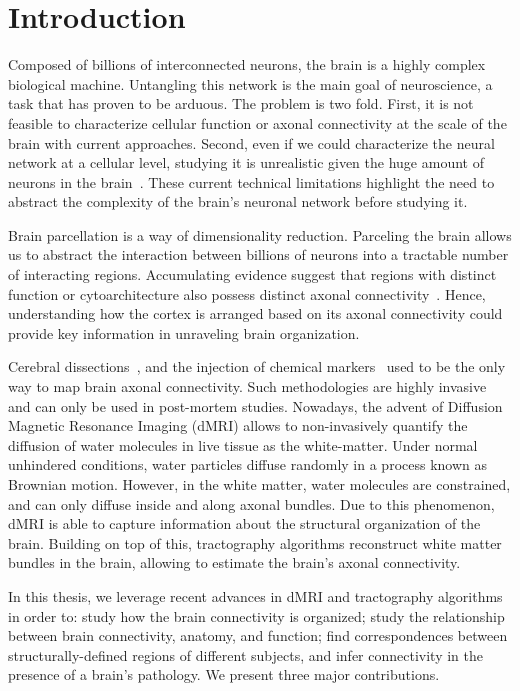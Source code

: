 \chapter{Introduction}

Composed of billions of interconnected neurons, the brain is a highly complex
biological machine. Untangling this network is the main goal of neuroscience,
a task that has proven to be arduous. The problem is two fold. First, it is
not feasible to characterize cellular function or axonal connectivity at the
scale of the brain with current approaches. Second, even if we could characterize
the neural network at a cellular level, studying it is unrealistic given the
huge amount of neurons in the brain~\cite{Gong2009}.
These current technical limitations highlight the need to abstract the complexity
of the brain's neuronal network before studying it.

Brain parcellation is a way of dimensionality reduction. Parceling the brain
allows us to abstract the interaction between billions of neurons into a tractable
number of interacting regions. Accumulating evidence suggest that regions with
distinct function or cytoarchitecture also possess distinct axonal connectivity~\citep{Passingham2002, Johansen-Berg2004, Honey2009, Eickhoff2010}.
Hence, understanding how the cortex is arranged based on its axonal connectivity
could provide key information in unraveling brain organization. 

Cerebral dissections~\cite{Meynert1872, Brodmann1909, Gray1918},
and the injection of chemical markers~\cite{Schmahmann2006, Stephan2013} used to
be the only way to map brain axonal connectivity. Such methodologies are highly
invasive and can only be used in post-mortem studies. Nowadays, the advent of
Diffusion Magnetic Resonance Imaging (dMRI) allows to non-invasively quantify
the diffusion of water molecules in live tissue as the white-matter. Under
normal unhindered conditions, water particles diffuse randomly in a process
known as Brownian motion. However, in the white matter, water molecules are
constrained, and can only diffuse inside and along axonal bundles. Due to this
phenomenon, dMRI is able to capture information about the structural organization
of the brain. Building on top of this, tractography algorithms reconstruct
white matter bundles in the brain, allowing to estimate the brain's axonal
connectivity.

In this thesis, we leverage recent advances in dMRI and tractography algorithms
in order to: study how the brain connectivity is organized; study the relationship
between brain connectivity, anatomy, and function; find correspondences between 
structurally-defined regions of different subjects, and infer connectivity in
the presence of a brain’s pathology. We present three major contributions.

